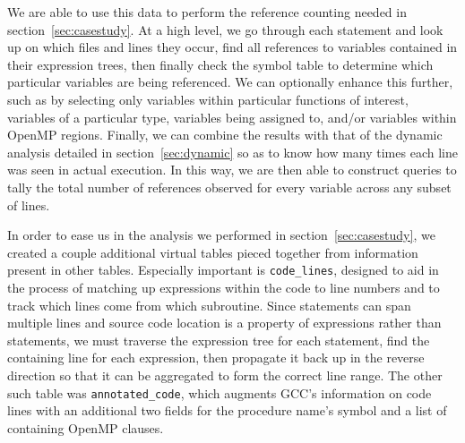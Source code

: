 We are able to use this data to perform the reference counting needed in 
section~\ref{sec:casestudy}.
At a high level, we go through each statement and look up on which files and lines they occur, find all 
references to variables contained in their expression trees, then finally check the symbol table to 
determine which particular variables are being referenced.
We can optionally enhance this further, such as by selecting only variables within particular functions 
of interest, variables of a particular type, variables being assigned to, and/or variables within 
OpenMP regions.
Finally, we can combine the results with that of the dynamic analysis detailed in 
section~\ref{sec:dynamic} so as to know how many times each line was seen in actual execution.
In this way, we are then able to construct queries to tally the total number of references observed for 
every variable across any subset of lines.

In order to ease us in the analysis we performed in section~\ref{sec:casestudy}, we created a couple 
additional virtual tables pieced together from information present in other tables.
Especially important is \texttt{code\_lines}, designed to aid in the process of matching up 
expressions within the code to line numbers and to track which lines come from which subroutine.
Since statements can span multiple lines and source code location is a property of expressions 
rather than statements, we must traverse the expression tree for each statement, find the containing 
line for each expression, then propagate it back up in the reverse direction so that it can be 
aggregated to form the correct line range.
The other such table was \texttt{annotated\_code}, which augments \acs{GCC}'s information on code 
lines with an additional two fields for the procedure name's symbol and a list of containing OpenMP 
clauses.


